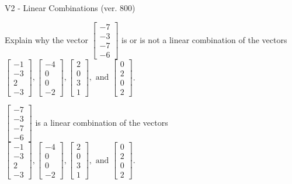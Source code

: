 \begin{exercise}
  \begin{exerciseTitle}V2 - Linear Combinations (ver. 800)\end{exerciseTitle}
  \begin{exerciseStatement}
    Explain why the vector \(\left[\begin{array}{c}
-7 \\
-3 \\
-7 \\
-6
\end{array}\right]\)  is or is not a linear 
	combination of the vectors \(\left[\begin{array}{c}
-1 \\
-3 \\
2 \\
-3
\end{array}\right] , \left[\begin{array}{c}
-4 \\
0 \\
0 \\
-2
\end{array}\right] , \left[\begin{array}{c}
2 \\
0 \\
3 \\
1
\end{array}\right] , \text{ and } \left[\begin{array}{c}
0 \\
2 \\
0 \\
2
\end{array}\right]\).
	


  \end{exerciseStatement}
  \begin{exerciseAnswer}
   \(\left[\begin{array}{c}
-7 \\
-3 \\
-7 \\
-6
\end{array}\right]\) 
  	 is  
	a linear combination of the vectors \(\left[\begin{array}{c}
-1 \\
-3 \\
2 \\
-3
\end{array}\right] , \left[\begin{array}{c}
-4 \\
0 \\
0 \\
-2
\end{array}\right] , \left[\begin{array}{c}
2 \\
0 \\
3 \\
1
\end{array}\right] , \text{ and } \left[\begin{array}{c}
0 \\
2 \\
0 \\
2
\end{array}\right]\).


\end{exerciseAnswer}
\end{exercise}
